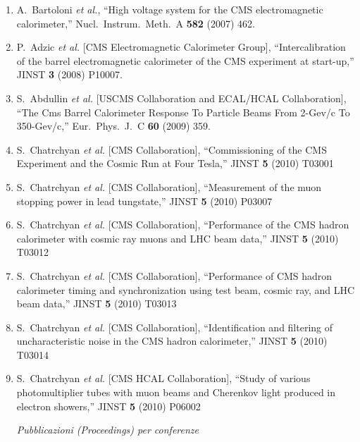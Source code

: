 \documentclass[10pt]{letter}
\begin{document}
\begin{enumerate}

\item A.~Bartoloni {\it et al.},
  ``High voltage system for the CMS electromagnetic calorimeter,''
  Nucl.\ Instrum.\ Meth.\  A {\bf 582} (2007) 462.

\item P.~Adzic {\it et al.}  [CMS Electromagnetic Calorimeter Group],
  ``Intercalibration of the barrel electromagnetic calorimeter of the CMS
  experiment at start-up,'' JINST {\bf 3} (2008) P10007.

\item S.~Abdullin {\it et al.}  [USCMS Collaboration and ECAL/HCAL Collaboration],
  ``The Cms Barrel Calorimeter Response To Particle Beams From 2-Gev/c To 350-Gev/c,''
  Eur.\ Phys.\ J.\  C {\bf 60} (2009) 359.

\item S.~Chatrchyan {\it et al.}  [CMS Collaboration],
  ``Commissioning of the CMS Experiment and the Cosmic Run at Four Tesla,''
  JINST {\bf 5} (2010) T03001

\item S.~Chatrchyan {\it et al.}  [CMS Collaboration],
  ``Measurement of the muon stopping power in lead tungstate,''
  JINST {\bf 5} (2010) P03007

\item S.~Chatrchyan {\it et al.}  [CMS Collaboration],
  ``Performance of the CMS hadron calorimeter with cosmic ray muons and LHC beam data,''
  JINST {\bf 5} (2010) T03012

\item S.~Chatrchyan {\it et al.}  [CMS Collaboration],
  ``Performance of CMS hadron calorimeter timing and synchronization using test beam, cosmic ray, and LHC beam data,''
  JINST {\bf 5} (2010) T03013

\item S.~Chatrchyan {\it et al.}  [CMS Collaboration],
  ``Identification and filtering of uncharacteristic noise in the CMS hadron calorimeter,''
  JINST {\bf 5} (2010) T03014

\item S.~Chatrchyan {\it et al.}  [CMS HCAL Collaboration],
  ``Study of various photomultiplier tubes with muon beams and Cherenkov light produced in electron showers,''
  JINST {\bf 5} (2010) P06002

\begin{center} \textit{Pubblicazioni (Proceedings) per conferenze} \\ \end{center}


\end{enumerate}
\end{document}
